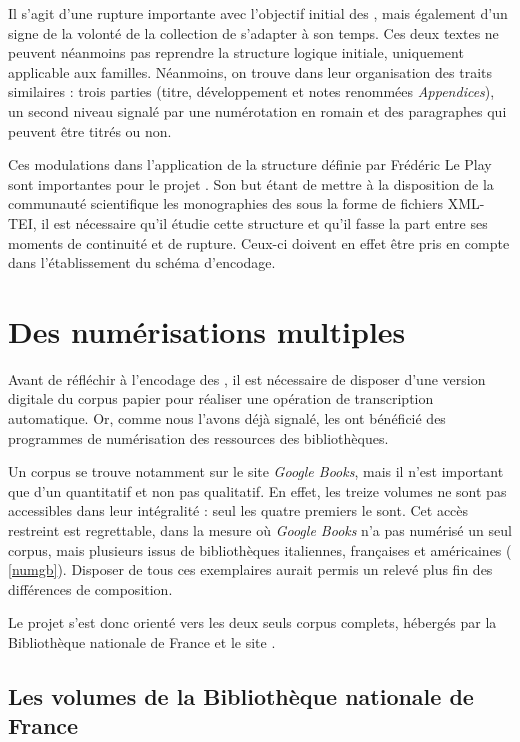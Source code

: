 Il s'agit d'une rupture importante avec l'objectif initial des \odm, mais également d'un signe de la volonté de la collection de s'adapter à son temps. Ces deux textes ne peuvent néanmoins pas reprendre la structure logique initiale, uniquement applicable aux familles. Néanmoins, on trouve dans leur organisation des traits similaires : trois parties (titre, développement et notes renommées \textit{Appendices}), un second niveau signalé par une numérotation en romain et des paragraphes qui peuvent être titrés ou non.

Ces modulations dans l'application de la structure définie par Frédéric Le Play sont importantes pour le projet \timeus. Son but étant de mettre à la disposition de la communauté scientifique les monographies des \odm{} sous la forme de fichiers XML-TEI, il est nécessaire qu'il étudie cette structure et qu'il fasse la part entre ses moments de continuité et de rupture. Ceux-ci doivent en effet être pris en compte dans l'établissement du schéma d'encodage.

\chapter{Des numérisations multiples}

Avant de réfléchir à l'encodage des \odm, il est nécessaire de disposer d'une version digitale du corpus \og papier \fg{} pour réaliser une opération de transcription automatique. Or, comme nous l'avons déjà signalé, les \odm{} ont bénéficié des programmes de numérisation des ressources des bibliothèques.

Un corpus se trouve notamment sur le site \textit{Google Books}, mais il n'est important que d'un \pov{} quantitatif et non pas qualitatif. En effet, les treize volumes ne sont pas accessibles dans leur intégralité : seul les quatre premiers le sont. Cet accès restreint est regrettable, dans la mesure où \textit{Google Books} n'a pas numérisé un seul corpus, mais plusieurs issus de bibliothèques italiennes, françaises et américaines (\ann{} \ref{numgb}). Disposer de tous ces exemplaires aurait permis un relevé plus fin des différences de composition.

Le projet \timeus{} s'est donc orienté vers les deux seuls corpus complets, hébergés par la Bibliothèque nationale de France et le site \ia.

\section{Les volumes de la Bibliothèque nationale de France}

